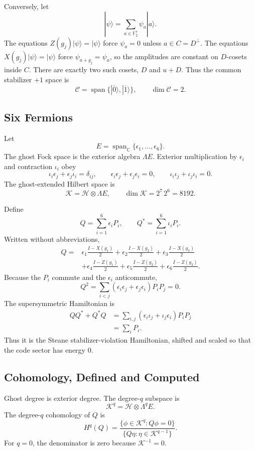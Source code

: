 Conversely, let
\[
  |\psi\rangle=\sum_{a\in\mathbb F_2^7}\psi_a|a\rangle .
\]
The equations \(Z(g_j)|\psi\rangle=|\psi\rangle\) force \(\psi_a=0\) unless
\(a\in C=D^\perp\). The equations \(X(g_j)|\psi\rangle=|\psi\rangle\) force
\(\psi_{a+g_j}=\psi_a\), so the amplitudes are constant on \(D\)-cosets inside
\(C\). There are exactly two such cosets, \(D\) and \(u+D\). Thus the common
stabilizer \(+1\) space is
\[
  \mathcal C=\operatorname{span}\{|\overline0\rangle,|\overline1\rangle\},
  \qquad \dim\mathcal C=2.
\]

\subsection{Six Fermions}

Let
\[
  E=\operatorname{span}_{\mathbb C}
  \{\epsilon_1,\ldots,\epsilon_6\}.
\]
The ghost Fock space is the exterior algebra \(\Lambda E\). Exterior
multiplication by \(\epsilon_i\) and contraction \(\iota_i\) obey
\[
  \iota_i\epsilon_j+\epsilon_j\iota_i=\delta_{ij},
  \qquad
  \epsilon_i\epsilon_j+\epsilon_j\epsilon_i=0,
  \qquad
  \iota_i\iota_j+\iota_j\iota_i=0.
\]
The ghost-extended Hilbert space is
\[
  \mathcal K=\mathcal H\otimes\Lambda E,
  \qquad
  \dim\mathcal K=2^7\,2^6=8192.
\]

Define
\[
  Q=\sum_{i=1}^6\epsilon_iP_i,\qquad
  Q^*=\sum_{i=1}^6\iota_iP_i .
\]
Written without abbreviations,
\[
\begin{aligned}
Q={}&
\epsilon_1\frac{I-X(g_1)}2+
\epsilon_2\frac{I-X(g_2)}2+
\epsilon_3\frac{I-X(g_3)}2\\
&+
\epsilon_4\frac{I-Z(g_1)}2+
\epsilon_5\frac{I-Z(g_2)}2+
\epsilon_6\frac{I-Z(g_3)}2 .
\end{aligned}
\]
Because the \(P_i\) commute and the \(\epsilon_i\) anticommute,
\[
  Q^2=\sum_{i<j}(\epsilon_i\epsilon_j+\epsilon_j\epsilon_i)P_iP_j=0.
\]
The supersymmetric Hamiltonian is
\[
\begin{aligned}
  QQ^*+Q^*Q
  &=\sum_{i,j}(\epsilon_i\iota_j+\iota_j\epsilon_i)P_iP_j\\
  &=\sum_iP_i .
\end{aligned}
\]
Thus it is the Steane stabilizer-violation Hamiltonian, shifted and scaled so
that the code sector has energy \(0\).

\subsection{Cohomology, Defined and Computed}

Ghost degree is exterior degree. The degree-\(q\) subspace is
\[
  \mathcal K^q=\mathcal H\otimes\Lambda^qE.
\]
The degree-\(q\) cohomology of \(Q\) is
\[
  H^q(Q)=
  \frac{\{\phi\in\mathcal K^q:Q\phi=0\}}
       {\{Q\eta:\eta\in\mathcal K^{q-1}\}} .
\]
For \(q=0\), the denominator is zero because \(\mathcal K^{-1}=0\).


